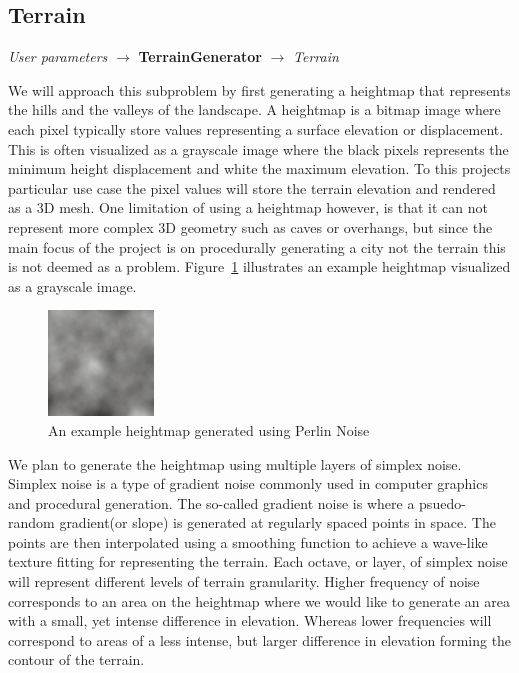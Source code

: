 \subsection{Terrain}
\begin{center}
  \textit{User parameters} $\rightarrow$ \textbf{TerrainGenerator}  $\rightarrow$ \textit{Terrain}
\end{center}

We will approach this subproblem by first generating a heightmap that represents the hills and the valleys of the landscape.
A heightmap is a bitmap image where each pixel typically store values representing a surface elevation or displacement.
This is often visualized as a grayscale image where the black pixels represents the minimum height displacement and white the maximum elevation.
To this projects particular use case the pixel values will store the terrain elevation and rendered as a 3D mesh.
One limitation of using a heightmap however, is that it can not represent more complex 3D geometry such as caves or overhangs, but since the main focus of the project is on procedurally generating a city not the terrain this is not deemed as a problem.
Figure~\ref{fig:heightmap} illustrates an example heightmap visualized as a grayscale image.

\begin{figure}[h]
  \centering
  \includegraphics[width=0.25\textwidth]{figure/heightmap.png}
  \caption{An example heightmap generated using Perlin Noise}
  \label{fig:heightmap}
\end{figure}

We plan to generate the heightmap using multiple layers of simplex noise.
Simplex noise is a type of gradient noise commonly used in computer graphics and procedural generation.
The so-called gradient noise is where a psuedo-random gradient(or slope) is generated at regularly spaced points in space.
The points are then interpolated using a smoothing function to achieve a wave-like texture fitting for representing the terrain.
Each octave, or layer, of simplex noise will represent different levels of terrain granularity.
Higher frequency of noise corresponds to an area on the heightmap where we would like to generate an area with a small, yet intense difference in elevation.
Whereas lower frequencies will correspond to areas of a less intense, but larger difference in elevation forming the contour of the terrain.

